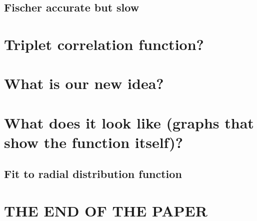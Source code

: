 \documentclass[letterpaper,twocolumn,amsmath,amssymb,pre]{revtex4-1}
\begin{document}
\subsection{Fischer accurate but slow}

\section{Triplet correlation function?}

\section{What is our new idea?}

\section{What does it look like (graphs that show the function itself)?}
\subsection{Fit to radial distribution function}


\section{THE END OF THE PAPER}
\end{document}
